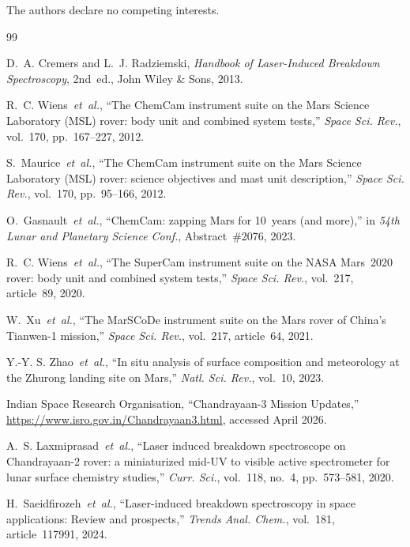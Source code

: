 \documentclass[a4paper,twocolumn,10pt]{article}
\begin{document}
The authors declare no competing interests.


\begin{thebibliography}{99}

D.~A. Cremers and L.~J. Radziemski,
\textit{Handbook of Laser-Induced Breakdown Spectroscopy}, 2nd~ed.,
John Wiley \& Sons, 2013.

R.~C. Wiens~\emph{et~al.},
``The ChemCam instrument suite on the Mars Science Laboratory (MSL)
rover: body unit and combined system tests,''
\textit{Space Sci. Rev.}, vol.~170, pp.~167--227, 2012.

S.~Maurice~\emph{et~al.},
``The ChemCam instrument suite on the Mars Science Laboratory (MSL)
rover: science objectives and mast unit description,''
\textit{Space Sci. Rev.}, vol.~170, pp.~95--166, 2012.

O.~Gasnault~\emph{et~al.},
``ChemCam: zapping Mars for 10~years (and more),''
in \textit{54th Lunar and Planetary Science Conf.}, Abstract~\#2076,
2023.

R.~C. Wiens~\emph{et~al.},
``The SuperCam instrument suite on the NASA Mars~2020 rover: body
unit and combined system tests,''
\textit{Space Sci. Rev.}, vol.~217, article~89, 2020.

W.~Xu~\emph{et~al.},
``The MarSCoDe instrument suite on the Mars rover of China's
Tianwen-1 mission,''
\textit{Space Sci. Rev.}, vol.~217, article~64, 2021.

Y.-Y. S. Zhao~\emph{et~al.},
``In situ analysis of surface composition and meteorology at the
Zhurong landing site on Mars,''
\textit{Natl. Sci. Rev.}, vol.~10, 2023.

Indian Space Research Organisation,
``Chandrayaan-3 Mission Updates,''
\url{https://www.isro.gov.in/Chandrayaan3.html},
accessed April 2026.

A.~S. Laxmiprasad~\emph{et~al.},
``Laser induced breakdown spectroscope on Chandrayaan-2 rover:
a miniaturized mid-UV to visible active spectrometer for lunar surface
chemistry studies,''
\textit{Curr. Sci.}, vol.~118, no.~4, pp.~573--581, 2020.

H.~Saeidfirozeh~\emph{et~al.},
``Laser-induced breakdown spectroscopy in space applications:
Review and prospects,''
\textit{Trends Anal. Chem.}, vol.~181, article~117991, 2024.


\end{thebibliography}
\end{document}
